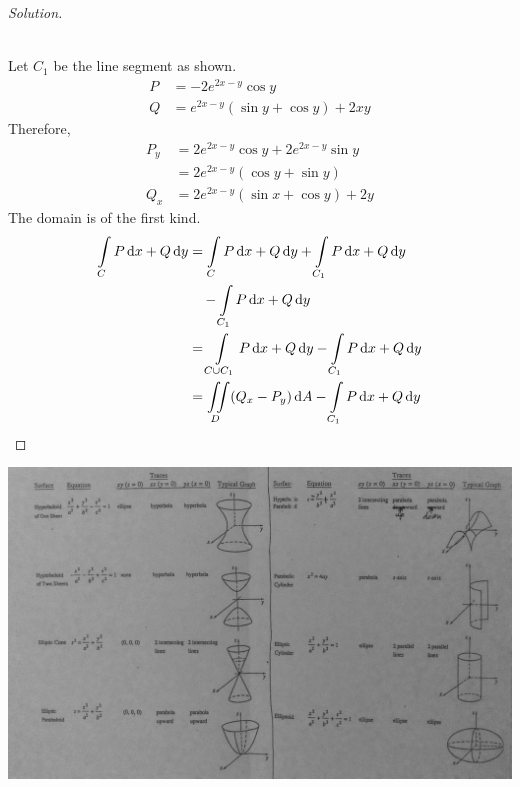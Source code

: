 \documentclass[fleqn, a4paper, 10pt]{article}
\theoremstyle{definition}
\theoremstyle{theorem}
\theoremstyle{remark}
\newenvironment{solution}
	{\begin{proof}[Solution]\let\qed\relax}
	{\end{proof}}
\begin{document}
\begin{multicols}{2}
\begin{solution}
	~\\
	\\
	Let $C_1$ be the line segment as shown.
	\begin{align*}
		P &= -2e^{2x - y} \cos y\\
		Q &= e^{2x - y} (\sin y + \cos y) + 2xy
	\end{align*}
	Therefore,
	\begin{align*}
		P_y &= 2e^{2x - y} \cos y + 2e^{2x - y} \sin y \\
		&= 2 e^{2x - y} (\cos y + \sin y)\\
		Q_x &= 2e^{2x - y} (\sin x + \cos y) + 2y
	\end{align*}
	The domain is of the first kind.
	\begin{align*}
		\int\limits_{C} P \dif x + Q \dif y &= \int\limits_{C} P \dif x + Q \dif y + \int\limits_{C_1} P \dif x + Q \dif y\\
		&\quad - \int\limits_{C_1} P \dif x + Q \dif y\\
		&= \int\limits_{C \cup C_1} P \dif x + Q \dif y - \int\limits_{C_1} P \dif x + Q \dif y\\
		&= \iint\limits_{D} (Q_x - P_y) \dif A - \int\limits_{C_1} P \dif x + Q \dif y
	\end{align*}
\end{solution}

\end{multicols}

\includegraphics[width = \textwidth]{IMG_5498_bw.JPG}
\end{document}
